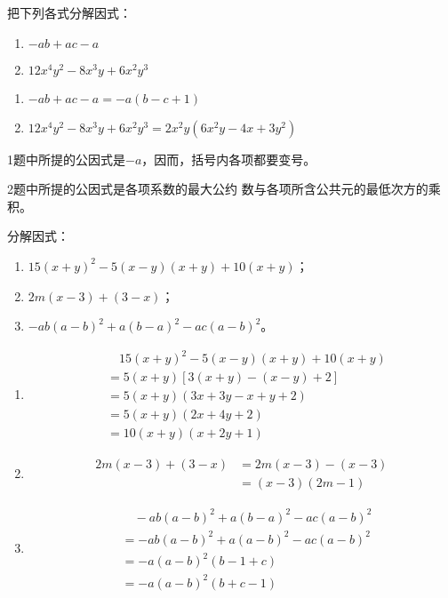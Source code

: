 \begin{example}
    把下列各式分解因式：
\begin{enumerate}
    \item $-ab+ac-a$
    \item $12x^4y^2-8x^3y+6x^2y^3$
\end{enumerate}
\end{example}

\begin{solution}
\begin{enumerate}
    \item $-ab+ac-a=-a(b-c+1)$
    \item $12x^4y^2-8x^3y+6x^2y^3=2x^2y(6x^2y-4x+3y^2)$
\end{enumerate}
\end{solution}

\begin{note}
1题中所提的公因式是$-a$，因而，括号内各项都要变号。

2题中所提的公因式是各项系数的最大公约
    数与各项所含公共元的最低次方的乘积。
\end{note}

\begin{example}
分解因式：
\begin{enumerate}
    \item $15(x+y)^2-5(x-y)(x+y)+10(x+y)$；
    \item $2m(x-3)+(3-x)$；
    \item $-ab(a-b)^2+a(b-a)^2-ac(a-b)^2$。
\end{enumerate} 
\end{example}

\begin{solution}
\begin{enumerate}
    \item \[\begin{split}
     &\quad   15 (x+y)^2-5 (x-y) (x+y)+10 (x+y)\\
    &=5 (x+y) [3(x+y)-(x-y)+2]\\
    &=5 (x+y) (3x+3y-x+y+2)\\
    &=5 (x+y) (2x+4y+2)\\
    &=10 (x+y) (x+2y+1)
    \end{split}\]
    \item \[\begin{split}
        2m (x-3) + (3-x)&= 2m (x-3) - (x-3)\\
        &= (x-3) (2m-1)
    \end{split}\]
        \item \[\begin{split}
       &\quad      -ab(a-b)^2 +a(b-a)^2 - ac(a-b)^2\\
            &= -ab (a-b)^2 +a (a-b)^2-ac (a-b)^2\\
            &=  -a (a-b)^2 (b-1+c)\\
            &=-a(a-b)^2 (b+c-1)
        \end{split}\]
\end{enumerate}
\end{solution}

